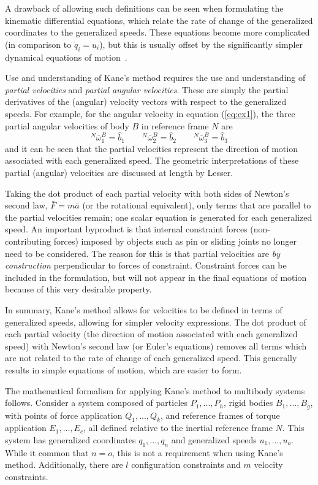 \documentclass[smallcondensed,final]{svjour3}                     %
\begin{document}
A drawback of allowing such definitions can be seen when formulating the
kinematic differential equations, which relate the rate of change of the
generalized coordinates to the generalized speeds. These equations become more
complicated (in comparison to $\dot{q}_i = u_i$), but this is usually offset by
the significantly simpler dynamical equations of motion~\cite{Mitiguy1996}.

Use and understanding of Kane's method requires the use and understanding of
\textit{partial velocities} and \textit{partial angular velocities}. These are
simply the partial derivatives of the (angular) velocity vectors with respect
to the generalized speeds. For example, for the angular velocity in equation
(\ref{eq:ex1}), the three partial angular velocities of body $B$ in reference
frame $N$ are
\[
{^N}\bar{\omega}^B_{1} = \hat{b}_1 \quad \quad
{^N}\bar{\omega}^B_{2} = \hat{b}_2 \quad \quad
{^N}\bar{\omega}^B_{3} = \hat{b}_3
\]
and it can be seen that the partial velocities represent the direction of
motion associated with each generalized speed. The geometric interpretations of
these partial (angular) velocities are discussed at length by
Lesser\cite{Lesser1992}.

Taking the dot product of each partial velocity with both sides of Newton's
second law, $\bar{F}=m\bar{a}$ (or the rotational equivalent), only terms that
are parallel to the partial velocities remain; one scalar equation is generated
for each generalized speed. An important byproduct is that internal constraint forces
(non-contributing forces) imposed by objects such as pin or sliding joints no
longer need to be considered. The reason for this is that partial velocities
are \textit{by construction} perpendicular to forces of constraint. Constraint
forces can be included in the formulation, but will not appear in the final
equations of motion because of this very desirable property.

In summary, Kane's method allows for velocities to be defined in terms of
generalized speeds, allowing for simpler velocity expressions.  The dot product
of each partial velocity (the direction of motion associated with each
generalized speed) with Newton's second law (or Euler's equations) removes all
terms which are not related to the rate of change of each generalized speed.
This generally results in simple equations of motion, which are easier to form.

The mathematical formalism for applying Kane's method to multibody systems
follows. Consider a system composed of particles $P_1,...,P_h$, rigid bodies
$B_1,...,B_g$, with points of force application $Q_1,...,Q_k$, and reference
frames of torque application $E_1,...,E_c$, all defined relative to the
inertial reference frame $N$. This system has generalized coordinates
$q_1,...,q_n$ and generalized speeds $u_1,...,u_o$.  While it common that $n =
o$, this is not a requirement when using Kane's method. Additionally, there are
$l$ configuration constraints and $m$ velocity constraints.
\end{document}
